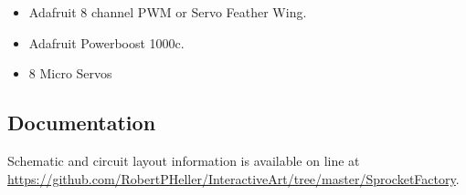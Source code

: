 \begin{itemize}
\item Adafruit 8 channel PWM or Servo Feather Wing.
\item Adafruit Powerboost 1000c.
\item 8 Micro Servos
\end{itemize}

\subsection*{Documentation}

Schematic and circuit layout information is available on line at 
\url{https://github.com/RobertPHeller/InteractiveArt/tree/master/SprocketFactory}.

